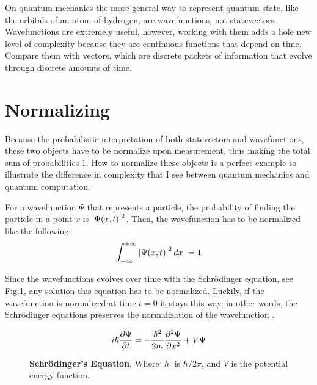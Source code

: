On quantum mechanics the more general way to represent quantum state, like the orbitals of an atom of hydrogen, are wavefunctions, not statevectors. Wavefunctions are extremely useful, however, working with them adds a hole new level of complexity because they are continuous functions that depend on time. Compare them with vectors, which are discrete packets of information that evolve through discrete amounts of time.

\section{Normalizing}
Because the probabilistic interpretation of both statevectors and wavefunctions, these two objects have to be normalize upon measurement, thus making the total sum of probabilities $1$. How to normalize these objects is a perfect example to illustrate the difference in complexity that I see between quantum mechanics and quantum computation. 

 For a wavefunction $\Psi$ that represents a particle, the probability of finding the particle in a point $x$ is $\abs{\Psi(x,t)}^2$. Then, the wavefunction has to be normalized like the following:
\begin{equation}
\int_{-\infty}^{+\infty}\abs{\Psi(x,t)}^2\, dx\ = 1
\label{eq:norm_wave}
\end{equation}

Since the wavefunctions evolves over time with the Schrödinger equation, see Fig.\ref{fig:schro}, any solution this equation has to be normalized. Luckily, if the wavefunction is normalized at time $t=0$ it stays this way, in other words, the Schrödinger equations preserves the normalization of the wavefunction \cite{IntroQM:normalizing}. 

\begin{figure}
	$$
	i\hslash \pdv{\Psi}{t} = -\frac{\hslash^2}{2m}\pdv[2]{\Psi}{x}+V\Psi
	$$
	\caption{\textbf{Schrödinger's Equation}. Where $\hslash$ is $h/2\pi$, and $V$ is the potential energy function.}
	\label{fig:schro}
\end{figure}

